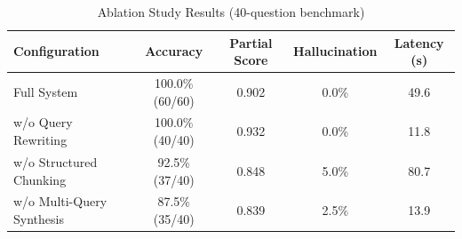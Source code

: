 \begin{table}[h]
\centering
\caption{Ablation Study Results (40-question benchmark)}
\label{tab:ablation}
\begin{tabular}{lcccc}
\toprule
\textbf{Configuration} & \textbf{Accuracy} & \textbf{Partial Score} & \textbf{Hallucination} & \textbf{Latency (s)} \\
\midrule
Full System & 100.0\% (60/60) & 0.902 & 0.0\% & 49.6 \\
w/o Query Rewriting & 100.0\% (40/40) & 0.932 & 0.0\% & 11.8 \\
w/o Structured Chunking & 92.5\% (37/40) & 0.848 & 5.0\% & 80.7 \\
w/o Multi-Query Synthesis & 87.5\% (35/40) & 0.839 & 2.5\% & 13.9 \\
\bottomrule
\end{tabular}
\end{table}